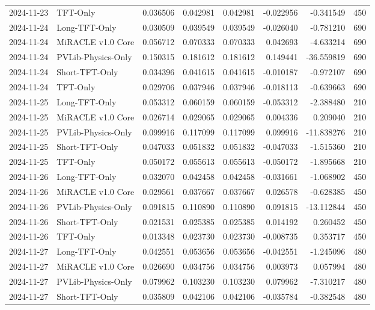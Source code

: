 \begin{tabular}{llrrrrrr}
2024-11-23 & TFT-Only & 0.036506 & 0.042981 & 0.042981 & -0.022956 & -0.341549 & 450 \\
2024-11-24 & Long-TFT-Only & 0.030509 & 0.039549 & 0.039549 & -0.026040 & -0.781210 & 690 \\
2024-11-24 & MiRACLE v1.0 Core & 0.056712 & 0.070333 & 0.070333 & 0.042693 & -4.633214 & 690 \\
2024-11-24 & PVLib-Physics-Only & 0.150315 & 0.181612 & 0.181612 & 0.149441 & -36.559819 & 690 \\
2024-11-24 & Short-TFT-Only & 0.034396 & 0.041615 & 0.041615 & -0.010187 & -0.972107 & 690 \\
2024-11-24 & TFT-Only & 0.029706 & 0.037946 & 0.037946 & -0.018113 & -0.639663 & 690 \\
2024-11-25 & Long-TFT-Only & 0.053312 & 0.060159 & 0.060159 & -0.053312 & -2.388480 & 210 \\
2024-11-25 & MiRACLE v1.0 Core & 0.026714 & 0.029065 & 0.029065 & 0.004336 & 0.209040 & 210 \\
2024-11-25 & PVLib-Physics-Only & 0.099916 & 0.117099 & 0.117099 & 0.099916 & -11.838276 & 210 \\
2024-11-25 & Short-TFT-Only & 0.047033 & 0.051832 & 0.051832 & -0.047033 & -1.515360 & 210 \\
2024-11-25 & TFT-Only & 0.050172 & 0.055613 & 0.055613 & -0.050172 & -1.895668 & 210 \\
2024-11-26 & Long-TFT-Only & 0.032070 & 0.042458 & 0.042458 & -0.031661 & -1.068902 & 450 \\
2024-11-26 & MiRACLE v1.0 Core & 0.029561 & 0.037667 & 0.037667 & 0.026578 & -0.628385 & 450 \\
2024-11-26 & PVLib-Physics-Only & 0.091815 & 0.110890 & 0.110890 & 0.091815 & -13.112844 & 450 \\
2024-11-26 & Short-TFT-Only & 0.021531 & 0.025385 & 0.025385 & 0.014192 & 0.260452 & 450 \\
2024-11-26 & TFT-Only & 0.013348 & 0.023730 & 0.023730 & -0.008735 & 0.353717 & 450 \\
2024-11-27 & Long-TFT-Only & 0.042551 & 0.053656 & 0.053656 & -0.042551 & -1.245096 & 480 \\
2024-11-27 & MiRACLE v1.0 Core & 0.026690 & 0.034756 & 0.034756 & 0.003973 & 0.057994 & 480 \\
2024-11-27 & PVLib-Physics-Only & 0.079962 & 0.103230 & 0.103230 & 0.079962 & -7.310217 & 480 \\
2024-11-27 & Short-TFT-Only & 0.035809 & 0.042106 & 0.042106 & -0.035784 & -0.382548 & 480 \\

\end{tabular}
